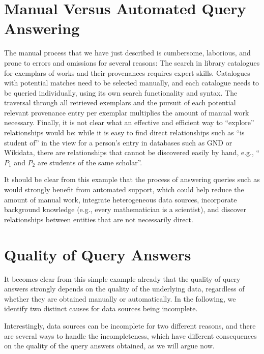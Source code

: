 \section{Manual Versus Automated Query Answering}
\label{sec:manual_vs_automated}

The manual process that we have just described is cumbersome, laborious, and prone to errors and omissions for several reasons:
The search in library catalogues for exemplars of works and their provenances requires expert skills.
Catalogues with potential matches need to be selected manually,
and each catalogue needs to be queried individually, using its own search functionality and syntax. 
The traversal through all retrieved exemplars and the pursuit of each potential relevant provenance entry per exemplar 
multiplies the amount of manual work necessary.
Finally, it is not clear what an effective and efficient way to \enquote{explore} relationships would be:
while it is easy to find direct relationships such as \enquote{is student of} in the view for a person's entry
in databases such as GND or Wikidata, there are relationships that cannot be discovered easily by hand,
e.g., \enquote{$P_1$ and $P_2$ are students of the same scholar}.

It should be clear from this example that the process of answering queries such as 
would strongly benefit from automated support, which could help reduce the amount of manual work, integrate heterogeneous data sources,
incorporate background knowledge (e.g., every mathematician is a scientist),
and discover relationships between entities that are not necessarily direct.


\section{Quality of Query Answers}
\label{sec:quality_of_answers}

It becomes clear from this simple example already that the quality of query answers
strongly depends on the quality of the underlying data, regardless of whether they are
obtained manually or automatically. 
In the following, we identify two distinct causes for data sources being incomplete.

Interestingly, data sources can be incomplete for two different reasons,
and there are several ways to handle the incompleteness,
which have different consequences on the quality of the query answers obtained,
as we will argue now.

